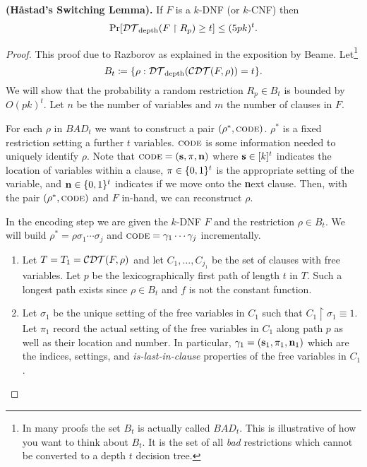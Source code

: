 \documentclass[11pt]{article}
\begin{document}
	\begin{theorem}
		\label{thm:haastadswitchinglemma}
		\textbf{(H\aa stad's Switching Lemma).} If $F$ is a $k$-DNF (or $k$-CNF) then
		\[\Pr[\mathcal{DT}_{\mathrm{depth}}(F \upharpoonright R_p) \geq t] \leq (5pk)^t.\]
	\end{theorem}
	\begin{proof}
		This proof due to Razborov as explained in the exposition by Beame. Let\footnote{In many proofs the set $B_t$ is actually called $BAD_t$. This is illustrative of how you want to think about $B_t$. It is the set of all \emph{bad} restrictions which cannot be converted to a depth $t$ decision tree.} 
		\[B_t \coloneqq \{\rho: \mathcal{DT}_{\mathrm{depth}}(\mathcal{CDT}(F, \rho)) = t\}.\]
		We will show that the probability a random restriction $R_p \in B_t$ is bounded by $O(pk)^t$. Let $n$ be the number of variables and $m$ the number of clauses in $F$.
		
		For each $\rho$ in $BAD_t$ we want to construct a pair $(\rho^*, \textsc{code})$. $\rho^*$ is a fixed restriction setting a further $t$ variables. $\textsc{code}$ is some information needed to uniquely identify $\rho$. Note that $\textsc{code} = \left(\mathbf{s}, \mathbf{\pi}, \mathbf{n}\right)$ where $\mathbf{s} \in [k]^t$ indicates the location of variables within a clause, $\mathbf{\pi} \in \{0,1\}^t$ is the appropriate setting of the variable, and $\mathbf{n} \in \{0,1\}^t$ indicates if we move onto the \textbf{n}ext clause. Then, with the pair $(\rho^*, \textsc{code})$ and $F$ in-hand, we can reconstruct $\rho$.
		
		In the encoding step we are given the $k$-DNF $F$ and the restriction $\rho \in B_t$. We will build $\rho^* = \rho\sigma_1\cdots\sigma_j$ and $\textsc{code} = \gamma_1\cdots\gamma_j$ incrementally.
		\begin{enumerate}
			\item Let $T = T_1 = \mathcal{CDT}(F, \rho)$ and let $C_{1}, ..., C_{j_1}$ be the set of clauses with free variables. Let $p$ be the lexicographically first path of length $t$ in $T$. Such a longest path exists since $\rho \in B_t$ and $f$ is not the constant function.
			\item Let $\sigma_1$ be the unique setting of the free variables in $C_{1}$ such that $C_{1} \upharpoonright \sigma_1 \equiv 1$. Let $\pi_{1}$ record the actual setting of the free variables in $C_{1}$ along path $p$ as well as their location and number. In particular, $\gamma_1 = (\mathbf{s}_1, \mathbf{\pi}_1, \mathbf{n}_1)$ which are the indices, settings, and \emph{is-last-in-clause} properties of the free variables in $C_{1}$.
			

\end{enumerate}
\end{proof}
\end{document}
